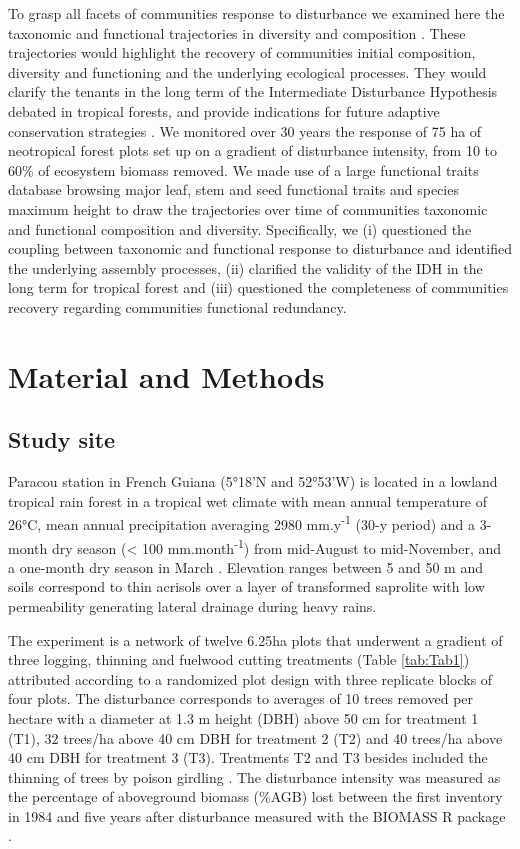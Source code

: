 \documentclass[fleqn,10pt]{ArtEcoFoG} %
\theoremstyle{definition}
\theoremstyle{definition}
\theoremstyle{definition}
\theoremstyle{remark}
\begin{document}
To grasp all facets of communities response to disturbance we examined
here the taxonomic and functional trajectories in diversity and
composition \citep{Lohbeck2015, Guariguata2001}. These trajectories
would highlight the recovery of communities initial composition,
diversity and functioning and the underlying ecological processes. They
would clarify the tenants in the long term of the Intermediate
Disturbance Hypothesis debated in tropical forests, and provide
indications for future adaptive conservation strategies
\citep{Adler2007}. We monitored over 30 years the response of 75 ha of
neotropical forest plots set up on a gradient of disturbance intensity,
from 10 to 60\% of ecosystem biomass removed. We made use of a large
functional traits database browsing major leaf, stem and seed functional
traits and species maximum height to draw the trajectories over time of
communities taxonomic and functional composition and diversity.
Specifically, we (i) questioned the coupling between taxonomic and
functional response to disturbance and identified the underlying
assembly processes, (ii) clarified the validity of the IDH in the long
term for tropical forest and (iii) questioned the completeness of
communities recovery regarding communities functional redundancy.

\section{Material and Methods}\label{material-and-methods}

\subsection{Study site}\label{study-site}

Paracou station in French Guiana (5°18'N and 52°53'W) is located in a
lowland tropical rain forest in a tropical wet climate with mean annual
temperature of 26°C, mean annual precipitation averaging 2980
mm.y\textsuperscript{-1} (30-y period) and a 3-month dry season
(\textless{} 100 mm.month\textsuperscript{-1}) from mid-August to
mid-November, and a one-month dry season in March \citep{Wagner2011}.
Elevation ranges between 5 and 50 m and soils correspond to thin
acrisols over a layer of transformed saprolite with low permeability
generating lateral drainage during heavy rains.

The experiment is a network of twelve 6.25ha plots that underwent a
gradient of three logging, thinning and fuelwood cutting treatments
(Table \ref{tab:Tab1}) attributed according to a randomized plot design
with three replicate blocks of four plots. The disturbance corresponds
to averages of 10 trees removed per hectare with a diameter at 1.3 m
height (DBH) above 50 cm for treatment 1 (T1), 32 trees/ha above 40 cm
DBH for treatment 2 (T2) and 40 trees/ha above 40 cm DBH for treatment 3
(T3). Treatments T2 and T3 besides included the thinning of trees by
poison girdling \citep{Schmitt1990, Blanc2009}. The disturbance
intensity was measured as the percentage of aboveground biomass (\%AGB)
lost between the first inventory in 1984 and five years after
disturbance \citep{Piponiot2016} measured with the BIOMASS R package
\citep{Biomass2018}.
\end{document}
